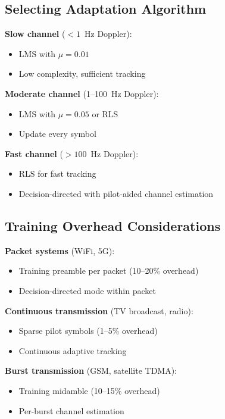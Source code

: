 \subsection{Selecting Adaptation Algorithm}

\textbf{Slow channel} ($< 1$~Hz Doppler):
\begin{itemize}
\item LMS with $\mu = 0.01$
\item Low complexity, sufficient tracking
\end{itemize}

\textbf{Moderate channel} (1--100~Hz Doppler):
\begin{itemize}
\item LMS with $\mu = 0.05$ or RLS
\item Update every symbol
\end{itemize}

\textbf{Fast channel} ($> 100$~Hz Doppler):
\begin{itemize}
\item RLS for fast tracking
\item Decision-directed with pilot-aided channel estimation
\end{itemize}

\subsection{Training Overhead Considerations}

\textbf{Packet systems} (WiFi, 5G):
\begin{itemize}
\item Training preamble per packet (10--20\% overhead)
\item Decision-directed mode within packet
\end{itemize}

\textbf{Continuous transmission} (TV broadcast, radio):
\begin{itemize}
\item Sparse pilot symbols (1--5\% overhead)
\item Continuous adaptive tracking
\end{itemize}

\textbf{Burst transmission} (GSM, satellite TDMA):
\begin{itemize}
\item Training midamble (10--15\% overhead)
\item Per-burst channel estimation
\end{itemize}

